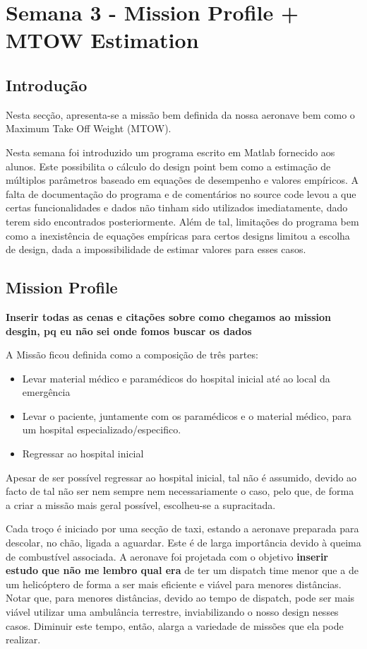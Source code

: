 \section{Semana 3 - Mission Profile + MTOW Estimation}
\subsection{Introdução}
Nesta secção, apresenta-se a missão bem definida da nossa aeronave bem como o Maximum Take Off Weight (MTOW).\par
Nesta semana foi introduzido um programa escrito em Matlab fornecido aos alunos. Este possibilita o cálculo do design point bem como a estimação de múltiplos parâmetros baseado em equações de desempenho e valores empíricos. A falta de documentação do programa e de comentários no source code levou a que certas funcionalidades e dados não tinham sido utilizados imediatamente, dado terem sido encontrados posteriormente. Além de tal, limitações do programa bem como a inexistência de equações empíricas para certos designs limitou a escolha de design, dada a impossibilidade de estimar valores para esses casos.\par
\subsection{Mission Profile}
{\large{\textbf{Inserir todas as cenas e citações sobre como chegamos ao mission desgin, pq eu não sei onde fomos buscar os dados}}}\par
A Missão ficou definida como a composição de três partes:
\begin{itemize}
    \item Levar material médico e paramédicos do hospital inicial até ao local da emergência
    \item Levar o paciente, juntamente com os paramédicos e o material médico, para um hospital especializado/especifico.
    \item Regressar ao hospital inicial
\end{itemize}
Apesar de ser possível regressar ao hospital inicial, tal não é assumido, devido ao facto de tal não ser nem sempre nem necessariamente o caso, pelo que, de forma a criar a missão mais geral possível, escolheu-se a supracitada.\par
Cada troço é iniciado por uma secção de taxi, estando a aeronave preparada para descolar, no chão, ligada a aguardar. Este é de larga importância devido à queima de combustível associada. A aeronave foi projetada com o objetivo \textbf{inserir estudo que não me lembro qual era} de ter um dispatch time menor que a de um helicóptero de forma a ser mais eficiente e viável para menores distâncias. Notar que, para menores distâncias, devido ao tempo de dispatch, pode ser mais viável utilizar uma ambulância terrestre, inviabilizando o nosso design nesses casos. Diminuir este tempo, então, alarga a variedade de missões que ela pode realizar.\par

